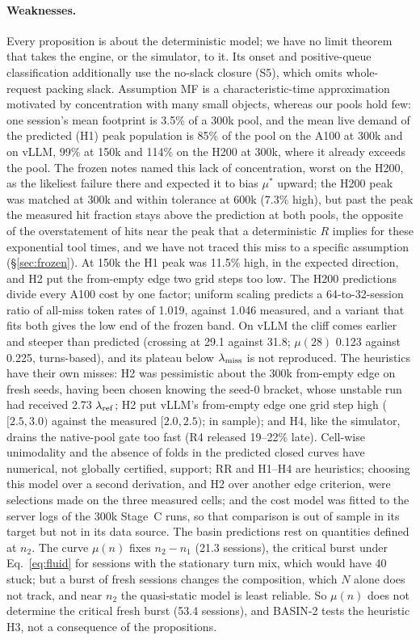 \paragraph{Weaknesses.}\label{sec:fp-weak}
Every proposition is about the deterministic model; we have no limit theorem that takes the engine, or the simulator, to it. Its onset and positive-queue classification additionally use the no-slack closure (S5), which omits whole-request packing slack. Assumption MF is a characteristic-time approximation motivated by concentration with many small objects, whereas our pools hold few: one session's mean footprint is 3.5\% of a 300k pool, and the mean live demand of the predicted (H1) peak population is 85\% of the pool on the A100 at 300k and on vLLM, 99\% at 150k and 114\% on the H200 at 300k, where it already exceeds the pool. The frozen notes named this lack of concentration, worst on the H200, as the likeliest failure there and expected it to bias $\mu^*$ upward; the H200 peak was matched at 300k and within tolerance at 600k (7.3\% high), but past the peak the measured hit fraction stays above the prediction at both pools, the opposite of the overstatement of hits near the peak that a deterministic $R$ implies for these exponential tool times, and we have not traced this miss to a specific assumption (\S\ref{sec:frozen}). At 150k the H1 peak was 11.5\% high, in the expected direction, and H2 put the from-empty edge two grid steps too low. The H200 predictions divide every A100 cost by one factor; uniform scaling predicts a 64-to-32-session ratio of all-miss token rates of 1.019, against 1.046 measured, and a variant that fits both gives the low end of the frozen band. On vLLM the cliff comes earlier and steeper than predicted (crossing at 29.1 against 31.8; $\mu(28)$ 0.123 against 0.225\sps, turns-based), and its plateau below $\lambda_{\mathrm{miss}}$ is not reproduced. The heuristics have their own misses: H2 was pessimistic about the 300k from-empty edge on fresh seeds, having been chosen knowing the seed-0 bracket, whose unstable run had received 2.73 $\lambda_{\mathrm{ref}}$; H2 put vLLM's from-empty edge one grid step high ($[2.5,3.0)$ against the measured $[2.0,2.5)$; in sample); and H4, like the simulator, drains the native-pool gate too fast (R4 released 19--22\% late). Cell-wise unimodality and the absence of folds in the predicted closed curves have numerical, not globally certified, support; RR and H1--H4 are heuristics; choosing this model over a second derivation, and H2 over another edge criterion, were selections made on the three measured cells; and the cost model was fitted to the server logs of the 300k Stage~C runs, so that comparison is out of sample in its target but not in its data source. The basin predictions rest on quantities defined at $n_2$. The curve $\mu(n)$ fixes $n_2-n_1$ (21.3 sessions), the critical burst under Eq.~\eqref{eq:fluid} for sessions with the stationary turn mix, which would have 40 stuck; but a burst of fresh sessions changes the composition, which $N$ alone does not track, and near $n_2$ the quasi-static model is least reliable. So $\mu(n)$ does not determine the critical fresh burst (53.4 sessions), and BASIN-2 tests the heuristic H3, not a consequence of the propositions.

